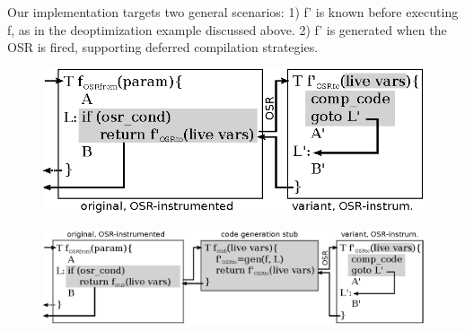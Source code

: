 Our implementation targets two general scenarios: 1) \textsf{f'} is known before executing \textsf{f}, as in the deoptimization example discussed above. 2) \textsf{f'} is generated when the OSR is fired, supporting deferred compilation strategies.


%
%

\ifdefined\noauthorea
\begin{figure}[t]
\begin{center}
\includegraphics[width=0.7\columnwidth]{figures/overview-osr-final/overview-osr-final.eps}
\caption{\protect}
\end{center}
\end{figure}
\fi

\ifdefined\noauthorea
\begin{figure}[t]
\begin{center}
\includegraphics[width=1.0\columnwidth]{figures/overview-osr-open/overview-osr-open.eps}
\caption{\protect}
\end{center}
\end{figure}
\fi

  
  
  
  
  
  
  
  
  
  
  
  
  
  
  
  
  
  
  
  
  
  
  
  
  
  
  
  
  
  